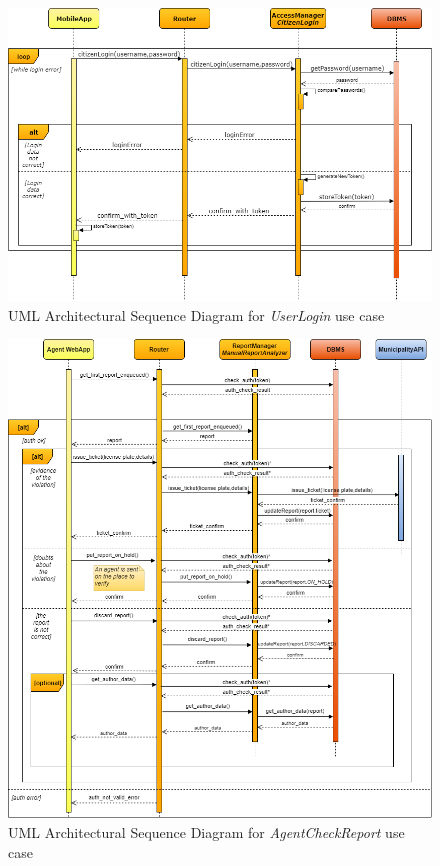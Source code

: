 \documentclass[a4paper]{report}
\begin{document}
\begin{landscape}

\begin{figure}[hp]
\includegraphics[angle=0, scale=0.70]{ArchSequenceUserLogin}
\caption{UML Architectural Sequence Diagram for \textit{UserLogin} use case}
\label{fig:seq-userLogin}
\end{figure}

\end{landscape}

\begin{figure}[hp]
\includegraphics[width=\textwidth]{ArchSequenceAgentCheckReport}
\caption{UML Architectural Sequence Diagram for \textit{AgentCheckReport} use case}
\label{fig:seq-checkReport}
\end{figure}
\restoregeometry
\end{document}
